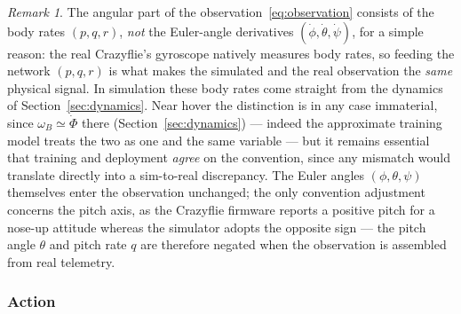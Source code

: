 \documentclass[11pt,a4paper]{article}
\theoremstyle{remark}
\newtheorem*{rmk}{Remark}
\numberwithin{equation}{section}
\begin{document}
\begin{rmk}
The angular part of the observation~\eqref{eq:observation} consists of the body rates
$(p, q, r)$, \emph{not} the Euler-angle derivatives $(\dot\phi, \dot\theta, \dot\psi)$, for
a simple reason: the real Crazyflie's gyroscope natively measures body rates, so feeding the
network $(p, q, r)$ is what makes the simulated and the real observation the \emph{same}
physical signal. In simulation these body rates come straight from the dynamics of
Section~\ref{sec:dynamics}. Near hover the distinction is in any case immaterial, since
$\omega_B \simeq \dot{\Phi}$ there (Section~\ref{sec:dynamics}) --- indeed the approximate
training model treats the two as one and the same variable --- but it remains essential that
training and deployment \emph{agree} on the convention, since any mismatch would translate
directly into a sim-to-real discrepancy. The Euler angles $(\phi, \theta, \psi)$ themselves enter the observation
unchanged; the only convention adjustment concerns the pitch axis, as the Crazyflie
firmware reports a positive pitch for a nose-up attitude whereas the simulator adopts the
opposite sign --- the pitch angle $\theta$ and pitch rate $q$ are therefore negated when
the observation is assembled from real telemetry.
\end{rmk}

\subsubsection*{Action}
\end{document}
